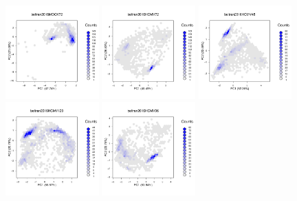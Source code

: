 \documentclass[12pt]{article}\usepackage[]{graphicx}\usepackage[]{color}
\begin{document}
\begin{appendices}
\begin{figure}[htb]\ContinuedFloat
  \includegraphics[width = 0.32\textwidth]{./figure/fighexpca-10.pdf}
  \includegraphics[width = 0.32\textwidth]{./figure/fighexpca-11.pdf}
  \includegraphics[width = 0.32\textwidth]{./figure/fighexpca-12.pdf}
  \includegraphics[width = 0.32\textwidth]{./figure/fighexpca-13.pdf}
  \includegraphics[width = 0.32\textwidth]{./figure/fighexpca-14.pdf}

\end{figure}
\end{appendices}
\end{document}

